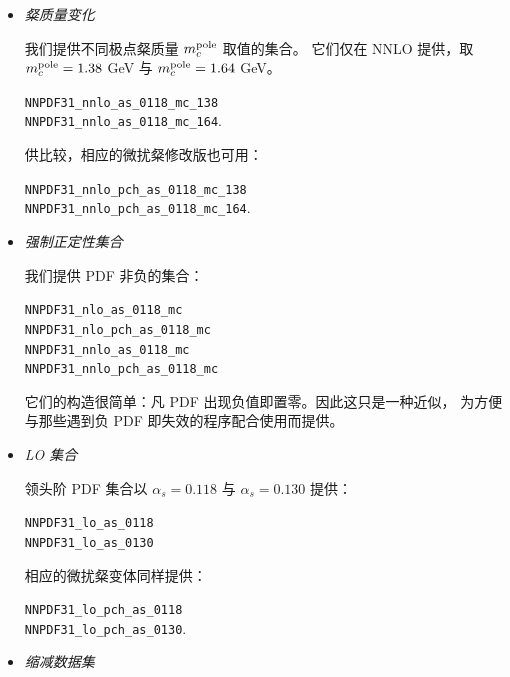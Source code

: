 \begin{itemize}
\item {\it 粲质量变化}


我们提供不同极点粲质量 $m_c^{\rm pole}$ 取值的集合。
  它们仅在 NNLO 提供，取 $m_c^{\rm pole}=1.38$ GeV 与 $m_c^{\rm pole}=1.64$ GeV。
  \begin{flushleft}
    {\tt NNPDF31\_nnlo\_as\_0118\_mc\_138}\\
    {\tt NNPDF31\_nnlo\_as\_0118\_mc\_164}.\\
\end{flushleft}
供比较，相应的微扰粲修改版也可用：
  \begin{flushleft}
     {\tt NNPDF31\_nnlo\_pch\_as\_0118\_mc\_138}\\
    {\tt NNPDF31\_nnlo\_pch\_as\_0118\_mc\_164}.\\
\end{flushleft}


\item {\it 强制正定性集合}

我们提供 PDF 非负的集合：
  \begin{flushleft}
    {\tt NNPDF31\_nlo\_as\_0118\_mc}\\
     {\tt NNPDF31\_nlo\_pch\_as\_0118\_mc}\\
     {\tt NNPDF31\_nnlo\_as\_0118\_mc}\\
      {\tt NNPDF31\_nnlo\_pch\_as\_0118\_mc}\\
\end{flushleft}
它们的构造很简单：凡 PDF 出现负值即置零。因此这只是一种近似，
为方便与那些遇到负 PDF 即失效的程序配合使用而提供。

\item {\it LO 集合} 

领头阶 PDF 集合以 $\alpha_s = 0.118$ 与 $\alpha_s = 0.130$ 提供：
  \begin{flushleft}
    {\tt NNPDF31\_lo\_as\_0118}\\
    {\tt NNPDF31\_lo\_as\_0130}\\
\end{flushleft}
相应的微扰粲变体同样提供：
  \begin{flushleft}
    {\tt NNPDF31\_lo\_pch\_as\_0118}\\
    {\tt NNPDF31\_lo\_pch\_as\_0130}.
\end{flushleft}


\item {\it 缩减数据集}


\end{itemize}
